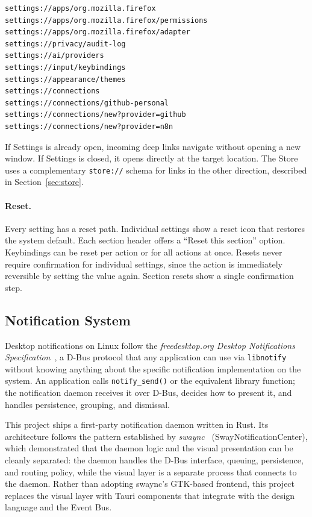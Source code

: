 \begin{lstlisting}[language=bash, caption={Settings deep link examples}]
settings://apps/org.mozilla.firefox
settings://apps/org.mozilla.firefox/permissions
settings://apps/org.mozilla.firefox/adapter
settings://privacy/audit-log
settings://ai/providers
settings://input/keybindings
settings://appearance/themes
settings://connections
settings://connections/github-personal
settings://connections/new?provider=github
settings://connections/new?provider=n8n
\end{lstlisting}

If Settings is already open, incoming deep links navigate without opening a
new window. If Settings is closed, it opens directly at the target location.
The Store uses a complementary \texttt{store://} schema for links in the
other direction, described in Section~\ref{sec:store}.

\paragraph{Reset.}
Every setting has a reset path. Individual settings show a reset icon that
restores the system default. Each section header offers a ``Reset this section''
option. Keybindings can be reset per action or for all actions at once. Resets
never require confirmation for individual settings, since the action is immediately
reversible by setting the value again. Section resets show a single
confirmation step.

\subsection{Notification System}
\label{sec:notifications}

Desktop notifications on Linux follow the \emph{freedesktop.org Desktop
Notifications Specification}~\cite{fdo:notifications}, a D-Bus protocol that
any application can use via \texttt{libnotify}~\cite{libnotify} without
knowing anything about the specific notification implementation on the system.
An application calls \texttt{notify\_send()} or the equivalent library function;
the notification daemon receives it over D-Bus, decides how to present it, and
handles persistence, grouping, and dismissal.

This project ships a first-party notification daemon written in Rust. Its
architecture follows the pattern established by
\emph{swaync}~\cite{swaync} (SwayNotificationCenter), which demonstrated
that the daemon logic and the visual presentation can be cleanly separated:
the daemon handles the D-Bus interface, queuing, persistence, and routing
policy, while the visual layer is a separate process that connects to the
daemon. Rather than adopting swaync's GTK-based frontend, this project
replaces the visual layer with Tauri components that integrate with the
design language and the Event Bus.

